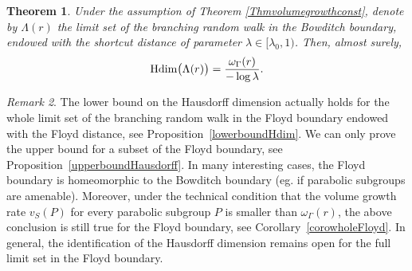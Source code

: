 \documentclass{amsart}
\newcommand{\showcomments}{yes}
\newenvironment{comment}%
{\ifthenelse{\equal{\showcomments}{yes}}%
{\footnotemark
    \begin{lrbox}{\commentbox}
    \begin{minipage}[t]{1.25in}\raggedright\sffamily\upshape\tiny
    \footnotemark[\arabic{footnote}]}%
{\begin{lrbox}{\commentbox}}}%
{\ifthenelse{\equal{\showcomments}{yes}}%
{\end{minipage}\end{lrbox}\marginpar{\usebox{\commentbox}}}%
{\end{lrbox}}}
\newtheorem{thm}{Theorem}[section]
\theoremstyle{definition}
\theoremstyle{remark}
\newtheorem{rem}[thm]{Remark}
\newcommand{\Hdim}{{\rm Hdim}}
\newcommand{\ywy}[1]{{\color{red}{#1}}}
\begin{document}
\begin{thm}\label{ThmHdimconst}
Under the assumption of Theorem \ref{Thmvolumegrowthconst}, denote by $\Lambda(r)$ the limit set of the branching random walk in the Bowditch boundary, endowed with the shortcut distance of parameter $\lambda\in [\lambda_0,1)$.
Then, almost surely,
$$\Hdim\big(\Lambda(r)\big)=\frac{\omega_\Gamma(r)}{-\log \lambda}.$$
\end{thm}
\begin{rem}
The lower bound on the Hausdorff dimension actually holds for the whole limit set of the branching random walk in the Floyd boundary endowed with the Floyd distance, see Proposition~\ref{lowerboundHdim}.
 We can only prove the upper bound for a subset of the Floyd boundary, see Proposition~\ref{upperboundHausdorff}. In many interesting cases, the Floyd boundary is homeomorphic to the Bowditch boundary (eg. if  parabolic subgroups are amenable). 
Moreover, under the technical condition that  the volume growth rate $v_S(P)$ for every parabolic subgroup $P$ is smaller than $\omega_{\Gamma}(r)$, the above conclusion is still true for the  Floyd boundary, see Corollary~\ref{corowholeFloyd}.
In general, the identification of the Hausdorff dimension  remains open for the full limit set in the Floyd boundary.
\end{rem}

\end{document}
